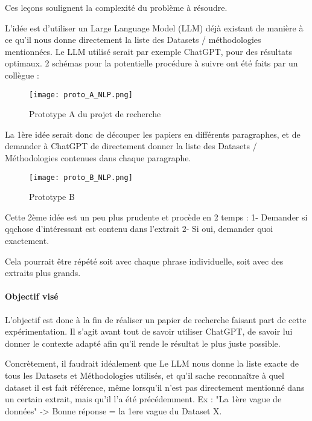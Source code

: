 Ces leçons soulignent la complexité du problème à résoudre.

L'idée est d'utiliser un Large Language Model (LLM) déjà existant de manière à ce qu'il nous donne directement la liste des Datasets / méthodologies mentionnées.
Le LLM utilisé serait par exemple ChatGPT, pour des résultats optimaux.
2 schémas pour la potentielle procédure à suivre ont été faits par un collègue :

\begin{figure}[H]
    \centering
    \texttt{[image: proto\_A\_NLP.png]}
    \caption{Prototype A du projet de recherche}
\end{figure}

La 1ère idée serait donc de découper les papiers en différents paragraphes, et de demander à ChatGPT de directement donner la liste des Datasets / Méthodologies contenues dans chaque paragraphe.

\begin{figure}[H]
    \centering
    \texttt{[image: proto\_B\_NLP.png]}
    \caption{Prototype B}
\end{figure}

Cette 2ème idée est un peu plus prudente et procède en 2 temps : 1- Demander si qqchose d'intéressant est contenu dans l'extrait
2- Si oui, demander quoi exactement.

Cela pourrait être répété soit avec chaque phrase individuelle, soit avec des extraits plus grands.


\paragraph{Objectif visé}

L'objectif est donc à la fin de réaliser un papier de recherche faisant part de cette expérimentation.
Il s'agit avant tout de savoir utiliser ChatGPT, de savoir lui donner le contexte adapté afin qu'il rende le résultat le plus juste possible.

Concrètement, il faudrait idéalement que Le LLM nous donne la liste exacte de tous les Datasets et Méthodologies utilisés, et qu'il sache reconnaître à quel dataset il est fait référence, même lorsqu'il n'est pas directement mentionné dans un certain extrait, mais qu'il l'a été précédemment.
Ex : "La 1ère vague de données" -> Bonne réponse = la 1ere vague du Dataset X.